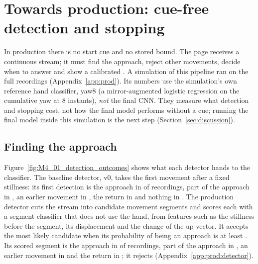 \section{Towards production: cue-free detection and stopping}\label{sec:production}

In production there is no start cue and no stored bound. The page receives a continuous stream; it must find the
approach, reject other movements, decide when to answer and show a calibrated \pright{}. A simulation of this
pipeline ran on the full recordings (Appendix~\ref{app:prod}). Its numbers use the simulation's own reference hand
classifier, yaw8 (a mirror-augmented logistic regression on the cumulative yaw at 8 instants), \emph{not} the final
CNN. They measure what detection and stopping cost, not how the final model performs without a cue; running the
final model inside this simulation is the next step (Section~\ref{sec:discussion}).

\subsection{Finding the approach}\label{sec:production:detection}
Figure~\ref{fig:M4_01_detection_outcomes} shows what each detector hands to the classifier. The baseline detector,
v0, takes the first movement after a fixed stillness: its first detection is the approach in
 of recordings, part of the approach in
, an earlier movement in ,
the return in  and nothing in . The production detector cuts the stream into candidate movement
segments and scores each with a segment classifier that does not use the hand, from features such as the stillness
before the segment, its displacement and the change of the up vector. It accepts the most likely candidate when
its probability of being an approach is at least . Its scored segment is the approach in
 of recordings, part of the approach in , an earlier
movement in  and the return in ; it rejects
 (Appendix~\ref{app:prod:detector}).

